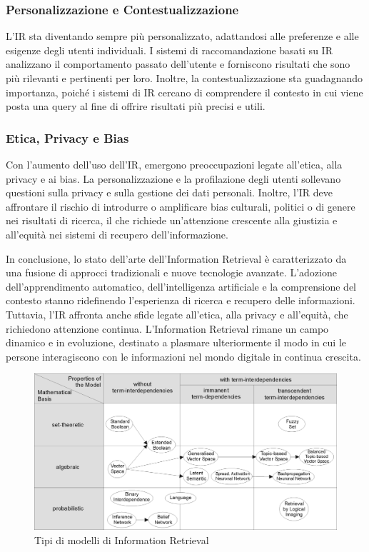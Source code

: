 \subsubsection{Personalizzazione e Contestualizzazione}
L'IR sta diventando sempre più personalizzato, adattandosi alle preferenze e alle esigenze degli utenti individuali. I sistemi di raccomandazione basati su IR analizzano il comportamento passato dell'utente e forniscono risultati che sono più rilevanti e pertinenti per loro. Inoltre, la contestualizzazione sta guadagnando importanza, poiché i sistemi di IR cercano di comprendere il contesto in cui viene posta una query al fine di offrire risultati più precisi e utili.

\subsubsection{Etica, Privacy e Bias}
Con l'aumento dell'uso dell'IR, emergono preoccupazioni legate all'etica, alla privacy e ai bias. La personalizzazione e la profilazione degli utenti sollevano questioni sulla privacy e sulla gestione dei dati personali. Inoltre, l'IR deve affrontare il rischio di introdurre o amplificare bias culturali, politici o di genere nei risultati di ricerca, il che richiede un'attenzione crescente alla giustizia e all'equità nei sistemi di recupero dell'informazione.

In conclusione, lo stato dell'arte dell'Information Retrieval è caratterizzato da una fusione di approcci tradizionali e nuove tecnologie avanzate. L'adozione dell'apprendimento automatico, dell'intelligenza artificiale e la comprensione del contesto stanno ridefinendo l'esperienza di ricerca e recupero delle informazioni. Tuttavia, l'IR affronta anche sfide legate all'etica, alla privacy e all'equità, che richiedono attenzione continua. L'Information Retrieval rimane un campo dinamico e in evoluzione, destinato a plasmare ulteriormente il modo in cui le persone interagiscono con le informazioni nel mondo digitale in continua crescita.

\begin{center}
    \begin{figure}
        \centering
        \includegraphics{images/typesofmodel.png}
        \caption{Tipi di modelli di Information Retrieval}
    \end{figure}
\end{center}